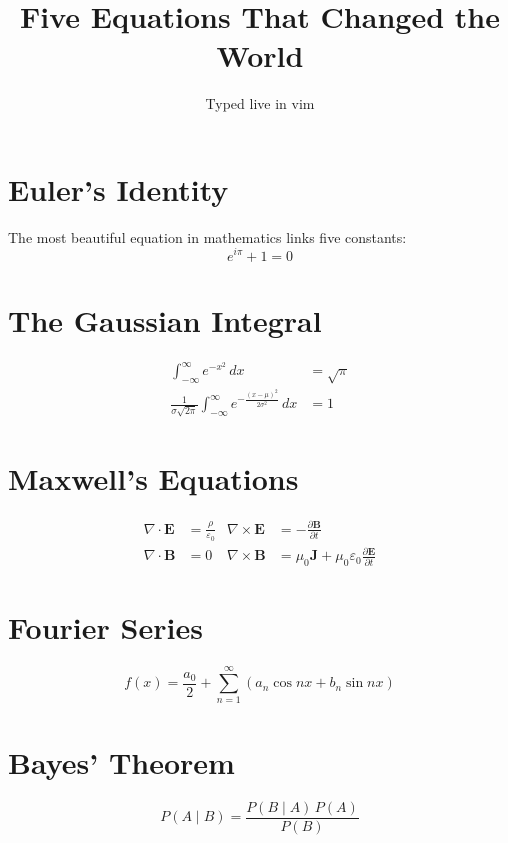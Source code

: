 \documentclass[11pt]{article}
\title{Five Equations That Changed the World}
\author{Typed live in vim}
\date{}
\begin{document}
\maketitle

\section{Euler's Identity}
The most beautiful equation in mathematics links five constants:
\[
  e^{i\pi} + 1 = 0
\]

\section{The Gaussian Integral}
\begin{align}
  \int_{-\infty}^{\infty} e^{-x^2}\,dx &= \sqrt{\pi} \\
  \frac{1}{\sigma\sqrt{2\pi}} \int_{-\infty}^{\infty}
    e^{-\frac{(x-\mu)^2}{2\sigma^2}}\,dx &= 1
\end{align}

\section{Maxwell's Equations}
\begin{align*}
  \nabla \cdot \mathbf{E} &= \frac{\rho}{\varepsilon_0} &
  \nabla \times \mathbf{E} &= -\frac{\partial \mathbf{B}}{\partial t} \\
  \nabla \cdot \mathbf{B} &= 0 &
  \nabla \times \mathbf{B} &= \mu_0 \mathbf{J}
    + \mu_0 \varepsilon_0 \frac{\partial \mathbf{E}}{\partial t}
\end{align*}

\section{Fourier Series}
\[
  f(x) = \frac{a_0}{2} + \sum_{n=1}^{\infty}
    \left( a_n \cos nx + b_n \sin nx \right)
\]
\begin{center}
\end{center}

\section{Bayes' Theorem}
\[
  P(A \mid B) = \frac{P(B \mid A)\, P(A)}{P(B)}
\]
\end{document}
